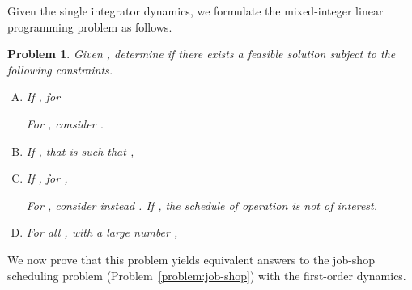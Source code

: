 \documentclass{sig-alternate}
\newtheorem{problem}{Problem}
\begin{document}
Given the single integrator dynamics, we formulate the mixed-integer linear programming problem as follows.

\begin{problem}\label{problem:milp}
	Given , determine if there exists a feasible solution subject to the following constraints.
	
\begin{enumerate}[A.]
	\item If , for 
	
	\label{constraint1:firstoperation}
	For , consider .
	\item If , that is  such that ,
	
	\label{constraint2:sequential}
	
	\item If , for ,
	
	\label{constraint3:process}
	For , consider instead . If , the schedule of operation  is not of interest.
	
	\item For all , with a large number ,
	
	\label{constraint4:disjunctive}
\end{enumerate}
\end{problem}

We now prove that this problem yields equivalent answers to the job-shop scheduling problem (Problem~\ref{problem:job-shop}) with the first-order dynamics.
\end{document}
